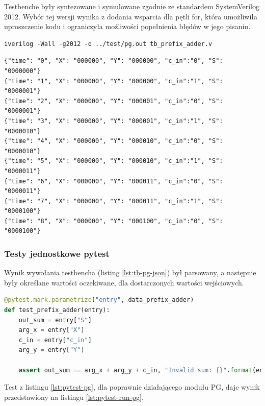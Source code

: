 \documentclass[12pt,oneside,reqno]{article}
\begin{document}
Testbenche były syntezowane i symulowane zgodnie ze standardem  SystemVerilog 2012. Wybór tej wersji wynika z dodania wsparcia dla pętli for, która umożliwiła uproszczenie kodu i ograniczyła możliwości popełnienia błędów w jego pisaniu.

\begin{lstlisting}[caption={Przykładowe wywołanie symulacji testbencha za pomocą programu Icarus Verilog.}, label={lst:iverilog-tb-run}]
iverilog -Wall -g2012 -o ../test/pg.out tb_prefix_adder.v
\end{lstlisting}

\begin{lstlisting}[caption={Początkowy fragment treści wynikowej wywołania testbencha dla modułu prefix\_adder}, label={lst:tb-pg-json}]
{"time": "0", "X": "000000", "Y": "000000", "c_in":"0", "S": "0000000"}
{"time": "1", "X": "000000", "Y": "000000", "c_in":"1", "S": "0000001"}
{"time": "2", "X": "000000", "Y": "000001", "c_in":"0", "S": "0000001"}
{"time": "3", "X": "000000", "Y": "000001", "c_in":"1", "S": "0000010"}
{"time": "4", "X": "000000", "Y": "000010", "c_in":"0", "S": "0000010"}
{"time": "5", "X": "000000", "Y": "000010", "c_in":"1", "S": "0000011"}
{"time": "6", "X": "000000", "Y": "000011", "c_in":"0", "S": "0000011"}
{"time": "7", "X": "000000", "Y": "000011", "c_in":"1", "S": "0000100"}
{"time": "8", "X": "000000", "Y": "000100", "c_in":"0", "S": "0000100"}
\end{lstlisting}

\clearpage
\subsubsection{Testy jednostkowe pytest}
Wynik wywołania testbencha (listing \ref{lst:tb-pg-json}) był parsowany, a następnie były określane wartości oczekiwane, dla dostarczonych wartości wejściowych.

\begin{lstlisting}[caption={Test jednostkowy pytest, dla modułu prefix\_adder}, label={lst:pytest-pg}, language=Python]
@pytest.mark.parametrize("entry", data_prefix_adder)
def test_prefix_adder(entry):
    out_sum = entry["S"]
    arg_x = entry["X"]
    c_in = entry["c_in"]
    arg_y = entry["Y"]

    assert out_sum == arg_x + arg_y + c_in, "Invalid sum: {}".format(entry)
\end{lstlisting}

Test z listingu \ref{lst:pytest-pg}, dla poprawnie działającego modułu PG, daje wynik przedstawiony na listingu \ref{lst:pytest-run-pg}.
\end{document}
